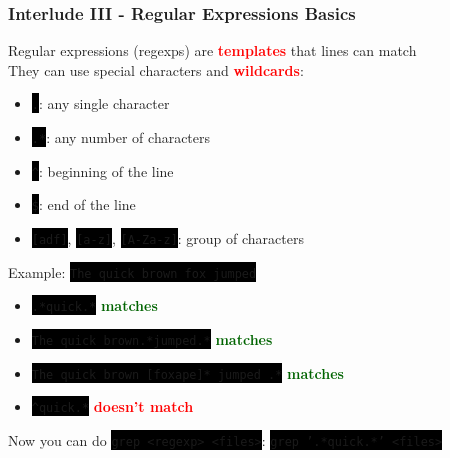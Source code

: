 \documentclass[unknownkeysallowed, 10pt, a4 paper, handout]{beamer}
\newcommand{\green}[1]{\textbf{\textcolor{darkgreen}{#1}}}
\newcommand{\red}[1]{\textbf{\textcolor{red}{#1}}}
\newcommand{\focus}[1]{\textbf{\textcolor{red}{#1}}}
\newcommand{\code}[1]{\colorbox{black}{\color{green}\texttt{#1}}}
\begin{document}
\begin{frame}
  \begin{center}
    \frametitle{Interlude III - Regular Expressions Basics}

    Regular expressions (regexps) are \focus{templates} that lines can match\\
    They can use special characters and \focus{wildcards}:

    \begin{itemize}
      \item \code{.}: any single character
      \item \code{.*}: any number of characters
      \item \code{\^}: beginning of the line
      \item \code{\$}: end of the line
      \item \code{[adf]}, \code{[a-z]}, \code{[A-Za-z]}: group of characters
    \end{itemize}

    Example: \code{The quick brown fox jumped}
    \vspace{-2mm}

    \begin{itemize}
      \item \code{.*quick.*} \green{matches}
      \item \code{The quick brown.*jumped.*} \green{matches}
      \item \code{The quick brown [foxape]* jumped .*} \green{matches}
      \item \code{\^{}quick.*} \red{doesn't match}
    \end{itemize}

    Now you can do \code{grep <regexp> <files>}:
    \code{grep '.*quick.*' <files>}
  \end{center}
\end{frame}
\end{document}
